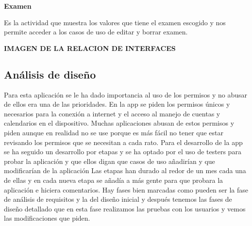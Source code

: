 \textbf{Examen}

Es la actividad que muestra los valores que tiene el examen escogido y nos permite acceder a los casos de uso de editar y borrar examen.

\textbf{IMAGEN DE LA RELACION DE INTERFACES}

\subsection{Análisis de diseño}
\label{subsecc:Análisis de diseño}

Para esta aplicación se le ha dado importancia al uso de los permisos y no abusar de ellos era una de las prioridades.
En la app se piden los permisos únicos y necesarios para la conexión a internet y el acceso al manejo de cuentas y calendarios en el dispositivo.
Muchas aplicaciones abusan de estos permisos y piden aunque en realidad no se use porque es más fácil no tener que estar revisando los permisos que se necesitan a cada rato.
Para el desarrollo de la app se ha seguido un desarrollo por etapas y se ha optado por el uso de testers para probar la aplicación y que ellos digan que casos de uso añadirían y que modificarían de la aplicación
Las etapas han durado al redor de un mes cada una de ellas y en cada nueva etapa se añadía a más gente para que probara la aplicación e hiciera comentarios.
Hay fases bien marcadas como pueden ser la fase de análisis de requisitos y la del diseño inicial y después tenemos las fases de diseño detallado que en esta fase realizamos las pruebas con los usuarios y vemos las modificaciones que piden.






















